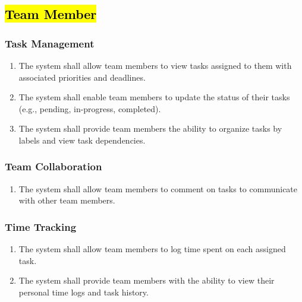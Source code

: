 \documentclass[]{article}
\begin{document}
        \subsection{\hl{Team Member}}
            \subsubsection{Task Management}
            \begin{enumerate}[label=\scriptsize\textbf{\textcolor{gray}{FR-TM-\arabic{tmCounter}}}, leftmargin=*, itemsep=-4px]
                \item The system shall allow team members to view tasks assigned to them with associated priorities and deadlines.
                \item The system shall enable team members to update the status of their tasks (e.g., pending, in-progress, completed).
                \item The system shall provide team members the ability to organize tasks by labels and view task dependencies.
            \end{enumerate}

            \subsubsection{Team Collaboration}
            \begin{enumerate}[label=\scriptsize\textbf{\textcolor{gray}{FR-TM-\arabic{tmCounter}}}, leftmargin=*, itemsep=-4px]
                \item The system shall allow team members to comment on tasks to communicate with other team members.
            \end{enumerate}

            \subsubsection{Time Tracking}
            \begin{enumerate}[label=\scriptsize\textbf{\textcolor{gray}{FR-TM-\arabic{tmCounter}}}, leftmargin=*, itemsep=-4px]
                \item The system shall allow team members to log time spent on each assigned task.
                \item The system shall provide team members with the ability to view their personal time logs and task history.
            \end{enumerate}
\end{document}
